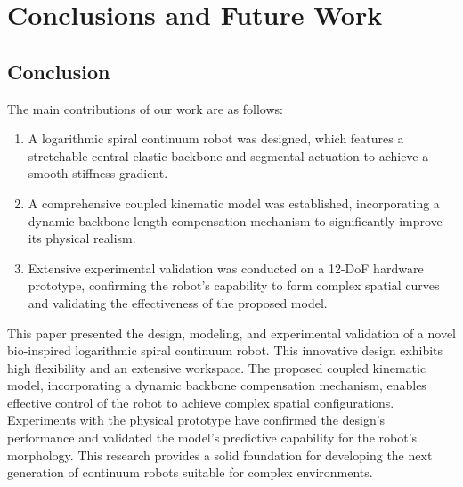 \documentclass[conference]{IEEEtran}
\begin{document}

\section{Conclusions and Future Work}

\subsection{Conclusion}
The main contributions of our work are as follows:

\begin{enumerate}
\def\labelenumi{\arabic{enumi}.}

\item
  A logarithmic spiral continuum robot was designed, which features a stretchable central elastic backbone and segmental actuation to achieve a smooth stiffness gradient.
\item
  A comprehensive coupled kinematic model was established, incorporating a dynamic backbone length compensation mechanism to significantly improve its physical realism.
\item
  Extensive experimental validation was conducted on a 12-DoF hardware prototype, confirming the robot's capability to form complex spatial curves and validating the effectiveness of the proposed model.
\end{enumerate}

This paper presented the design, modeling, and experimental validation of a novel bio-inspired logarithmic spiral continuum robot. This innovative design exhibits high flexibility and an extensive workspace. The proposed coupled kinematic model, incorporating a dynamic backbone compensation mechanism, enables effective control of the robot to achieve complex spatial configurations. Experiments with the physical prototype have confirmed the design's performance and validated the model's predictive capability for the robot's morphology. This research provides a solid foundation for developing the next generation of continuum robots suitable for complex environments.
\end{document}
